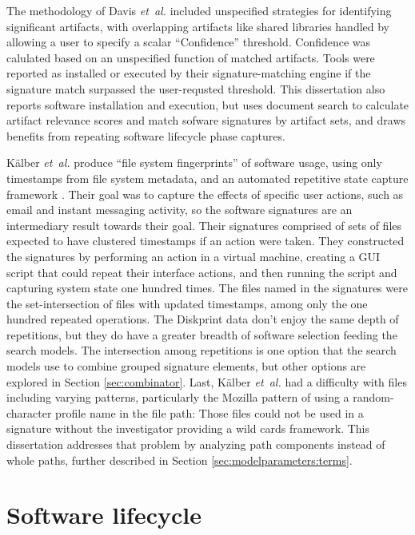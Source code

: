 \documentclass[11pt]{ucthesis}
\theoremstyle{plain}
\theoremstyle{definition}
\newcommand{\etal}{\emph{et~al.}\xspace}
\begin{document}
The methodology of Davis \etal included unspecified strategies for identifying significant artifacts, with overlapping artifacts like shared libraries handled by allowing a user to specify a scalar ``Confidence'' threshold.  Confidence was calulated based on an unspecified function of matched artifacts.  Tools were reported as installed or executed by their signature-matching engine if the signature match surpassed the user-requsted threshold.  This dissertation also reports software installation and execution, but uses document search to calculate artifact relevance scores and match sofware signatures by artifact sets, and draws benefits from repeating software lifecycle phase captures.

K{\"a}lber \etal produce ``file system fingerprints'' of software usage, using only timestamps from file system metadata, and an automated repetitive state capture framework \cite{kalber:imf13}.  Their goal was to capture the effects of specific user actions, such as email and instant messaging activity, so the software signatures are an intermediary result towards their goal.  Their signatures comprised of sets of files expected to have clustered timestamps if an action were taken.  They constructed the signatures by performing an action in a virtual machine, creating a GUI script that could repeat their interface actions, and then running the script and capturing system state one hundred times.  The files named in the signatures were the set-intersection of files with updated timestamps, among only the one hundred repeated operations.  The Diskprint data don't enjoy the same depth of repetitions, but they do have a greater breadth of software selection feeding the search models.  The intersection among repetitions is one option that the search models use to combine grouped signature elements, but other options are explored in Section \ref{sec:combinator}.  Last, K{\"a}lber \etal had a difficulty with files including varying patterns, particularly the Mozilla pattern of using a random-character profile name in the file path: Those files could not be used in a signature without the investigator providing a wild cards framework.  This dissertation addresses that problem by analyzing path components instead of whole paths, further described in Section \ref{sec:modelparameters:terms}.


\section{Software lifecycle}
\end{document}
